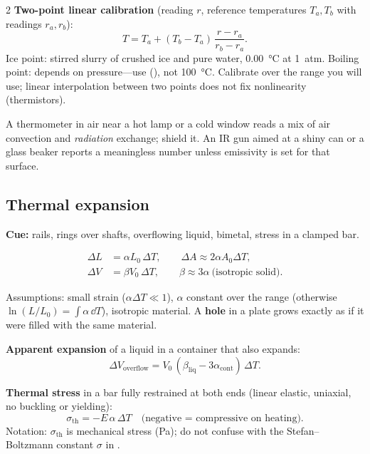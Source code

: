 \begin{multicols}{2}
\textbf{Two-point linear calibration} (reading $r$, reference temperatures $T_a,T_b$ with readings $r_a,r_b$):
\begin{equation}
T = T_a + (T_b-T_a)\,\frac{r-r_a}{r_b-r_a}. \label{F:temp:calib}
\end{equation}
Ice point: stirred slurry of crushed ice and pure water, \SI{0.00}{\celsius} at 1~atm. Boiling point: depends on pressure---use  (), not \SI{100}{\celsius}. Calibrate over the range you will use; linear interpolation between two points does not fix nonlinearity (thermistors).

\begin{trapbox}A thermometer in air near a hot lamp or a cold window reads a mix of air convection and \emph{radiation} exchange; shield it. An IR gun aimed at a shiny can or a glass beaker reports a meaningless number unless emissivity is set for that surface.\end{trapbox}

\subsection{Thermal expansion}\label{sec:expansion}
\CORE{} \textbf{Cue:} rails, rings over shafts, overflowing liquid, bimetal, stress in a clamped bar.
\begin{formulabox}
\vspace{-6pt}
\begin{align}
\Delta L &= \alpha L_0\,\Delta T,\qquad \Delta A \approx 2\alpha A_0\Delta T, \label{F:expand:linear}\\
\Delta V &= \beta V_0\,\Delta T,\qquad \beta\approx 3\alpha\ \text{(isotropic solid)}. \label{F:expand:volume}
\end{align}
\end{formulabox}
Assumptions: small strain ($\alpha\Delta T\ll1$), $\alpha$ constant over the range (otherwise $\ln(L/L_0)=\int\alpha\,\dd T$), isotropic material. A \textbf{hole} in a plate grows exactly as if it were filled with the same material.

\textbf{Apparent expansion} of a liquid in a container that also expands:
\begin{equation}
\Delta V_{\text{overflow}} = V_0\,(\beta_{\text{liq}}-3\alpha_{\text{cont}})\,\Delta T. \label{F:expand:apparent}
\end{equation}

\textbf{Thermal stress} in a bar fully restrained at both ends (linear elastic, uniaxial, no buckling or yielding):
\begin{equation}
\sigma_{\text{th}} = -E\,\alpha\,\Delta T \quad\text{(negative = compressive on heating).} \label{F:expand:stress}
\end{equation}
Notation: $\sigma_{\text{th}}$ is mechanical stress (Pa); do not confuse with the Stefan--Boltzmann constant $\sigma$ in .


\end{multicols}
